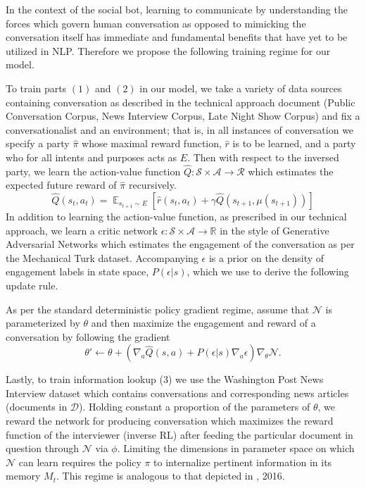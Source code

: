 \documentclass{article} %
\def\expect{\mathop{{\mathbb{E}}}}
\theoremstyle{named}
\def\scripta{{\mathcal A}}
\def\scriptr{{\mathcal R}}
\def\scriptd{{\mathcal D}}
\def\scriptn{{\mathcal N}}
\def\scripts{{\mathcal S}}
\begin{document}
In the context of the social bot, learning to communicate by understanding the forces which govern human conversation as opposed to mimicking the conversation itself has immediate and fundamental benefits that have yet to be utilized in NLP. Therefore we propose the following training regime for our model.

To train parts $(1)$ and $(2)$ in our model, we take a variety of data sources containing conversation as described in the technical approach document (Public Conversation Corpus, News Interview Corpus, Late Night Show Corpus) and fix a conversationalist and an environment; that is, in all instances of conversation we specify a party $\hat{\pi}$ whose maximal reward function, $\hat{r}$ is to be learned, and a party who for all intents and purposes acts as $E$. Then with respect to the inversed party, we learn the action-value function $\hat{Q}: \scripts \times \scripta \to \scriptr$ which estimates the expected future reward of $\hat{\pi}$ recursively.
\begin{equation*}
    \hat{Q}(s_t, a_t) = \expect_{s_{t+1} \sim E}\left[\hat{r}(s_{t}, a_t) + \gamma \hat{Q}(s_{t+1}, \mu(s_{t+1}))\right]
\end{equation*}
In addition to learning the action-value function, as prescribed in our technical approach, we learn a critic network $\epsilon: \scripts \times \scripta \to \mathbb{R}$ in the style of Generative Adversarial Networks \cite{NIPS2014_5423} which estimates the engagement of the conversation as per the Mechanical Turk dataset. Accompanying $\epsilon$ is a prior on the density of engagement labels in state space, $P(\epsilon | s)$, which we use to derive the following update rule.

As per the standard deterministic policy gradient \cite{icml2014c1_silver14} regime, assume that $\scriptn$ is parameterized by $\theta$ and then maximize the engagement and reward of a conversation by following the gradient
\begin{equation*}
	\theta' \leftarrow \theta + \left( \nabla_a \hat{Q}(s, a)  + P(\epsilon | s)\nabla_a \epsilon \right)\nabla_\theta  \scriptn.
\end{equation*}

Lastly, to train information lookup (3) we use the Washington Post News Interview dataset which contains conversations and corresponding news articles (documents in $\scriptd$). Holding constant a proportion of the parameters of $\theta$, we reward the network for producing conversation which maximizes the reward function of the interviewer (inverse RL) after feeding the particular document in question through $\scriptn$ via $\phi.$ Limiting the dimensions in parameter space on which $\scriptn$ can learn requires the policy $\pi$ to internalize pertinent information in its memory $M_t.$ This regime is analogous to that depicted in \citeauthor{DBLP:journals/corr/SantoroBBWL16}, 2016.

\printbibliography
\end{document}
